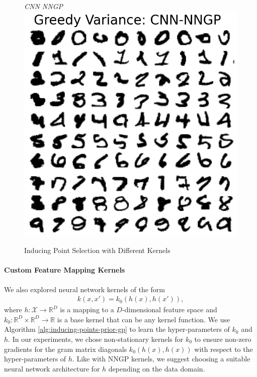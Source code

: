 \documentclass{article}
\numberwithin{equation}{section}
\begin{document}
\begin{figure}[h!]
\begin{minipage}{.25\textwidth}
\end{minipage}%
\begin{minipage}{.25\textwidth}
  \centering
  \textit{CNN NNGP}
  \includegraphics[width=\linewidth, trim={0 0 0 1.5cm},clip]{thesis_report/figures/mnist_inducing_point/greedy_mnist_cnn_nngp_inducing_point_selection.png}
\end{minipage}%
\caption{Inducing Point Selection with Different Kernels}\label{fig:mnist-inducing-points}
\end{figure}


\paragraph{Custom Feature Mapping Kernels} We also explored neural network kernels of the form
\begin{align}
    k(x, x') = k_0(h(x), h(x')),
    \label{custom-feature-map-kernel}
\end{align}
where $h: \mathcal{X} \rightarrow \mathbb{R}^D$ is a mapping to a $D$-dimensional feature space and $k_0: \mathbb{R}^D \times \mathbb{R}^D \rightarrow \mathbb{R}$ is a base kernel that can be any kernel function. 
We use Algorithm \ref{alg:inducing-points-prior-gp} to learn the hyper-parameters of $k_0$ and $h$. 
In our experiments, we chose non-stationary kernels for $k_0$ to ensure non-zero gradients for the gram matrix diagonals $k_0(h(x), h(x))$ with respect to the hyper-parameters of $h$. 
Like with NNGP kernels, we suggest choosing a suitable neural network architecture for $h$ depending on the data domain.
\end{document}

